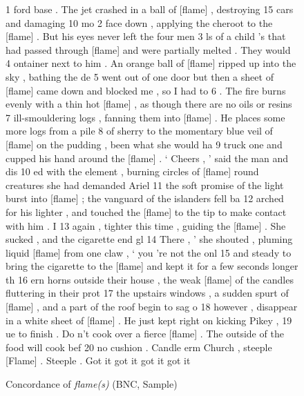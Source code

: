 \begin{figure}[!htbp]
\caption{Concordance of \textit{flame(s)} (BNC, Sample)}
\label{fig:flameconc}
\begin{fitverb}
 1  ford base . The jet crashed in a ball of [flame] , destroying 15 cars and damaging 10 mo
 2   face down , applying the cheroot to the [flame] . But his eyes never left the four men 
 3  ls of a child 's that had passed through [flame] and were partially melted . They would 
 4  ontainer next to him . An orange ball of [flame] ripped up into the sky , bathing the de
 5  went out of one door but then a sheet of [flame] came down and blocked me , so I had to 
 6   . The fire burns evenly with a thin hot [flame] , as though there are no oils or resins
 7  ill-smouldering logs , fanning them into [flame] . He places some more logs from a pile 
 8   of sherry to the momentary blue veil of [flame] on the pudding , been what she would ha
 9  truck one and cupped his hand around the [flame] . ` Cheers , ' said the man and dis
10  ed with the element , burning circles of [flame] round creatures she had demanded Ariel 
11  the soft promise of the light burst into [flame] ; the vanguard of the islanders fell ba
12  arched for his lighter , and touched the [flame] to the tip to make contact with him . I
13   again , tighter this time , guiding the [flame] . She sucked , and the cigarette end gl
14    There , ' she shouted , pluming liquid [flame] from one claw , ` you 're not the onl
15  and steady to bring the cigarette to the [flame] and kept it for a few seconds longer th
16  ern horns outside their house , the weak [flame] of the candles fluttering in their prot
17  the upstairs windows , a sudden spurt of [flame] , and a part of the roof begin to sag o
18   however , disappear in a white sheet of [flame] . He just kept right on kicking Pikey ,
19  ue to finish . Do n't cook over a fierce [flame] . The outside of the food will cook bef
20  no cushion . Candle erm Church , steeple [Flame] . Steeple . Got it got it got it got it


\end{fitverb}
\end{figure}
